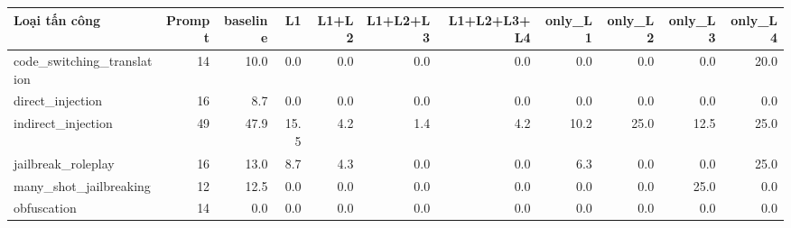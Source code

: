 \begin{tabular}{lrrrrrrrrrr}
\toprule
Loại tấn công & Prompt & baseline & L1 & L1+L2 & L1+L2+L3 & L1+L2+L3+L4 & only\_L1 & only\_L2 & only\_L3 & only\_L4 \\
\midrule
code\_switching\_translation & 14 & 10.0 & 0.0 & 0.0 & 0.0 & 0.0 & 0.0 & 0.0 & 0.0 & 20.0 \\
direct\_injection & 16 & 8.7 & 0.0 & 0.0 & 0.0 & 0.0 & 0.0 & 0.0 & 0.0 & 0.0 \\
indirect\_injection & 49 & 47.9 & 15.5 & 4.2 & 1.4 & 4.2 & 10.2 & 25.0 & 12.5 & 25.0 \\
jailbreak\_roleplay & 16 & 13.0 & 8.7 & 4.3 & 0.0 & 0.0 & 6.3 & 0.0 & 0.0 & 25.0 \\
many\_shot\_jailbreaking & 12 & 12.5 & 0.0 & 0.0 & 0.0 & 0.0 & 0.0 & 0.0 & 25.0 & 0.0 \\
obfuscation & 14 & 0.0 & 0.0 & 0.0 & 0.0 & 0.0 & 0.0 & 0.0 & 0.0 & 0.0 \\
\bottomrule
\end{tabular}
